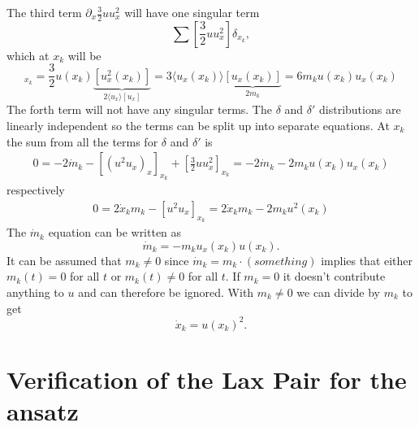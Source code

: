 \documentclass[english,master]{liumaiex}
\theoremstyle{plain}
\theoremstyle{definition}
\begin{document}
The third term $\partial_x \frac{3}{2}u u_x^2$ will have one singular term
\begin{equation}
	\sum [\frac{3}{2} u u_x^2] \delta_{x_k},
\end{equation}
which at $x_k$ will be
\begin{equation}
	[\frac{3}{2}u u_x^2]_{x_k} = \frac{3}{2}u(x_k) \underbrace{[u_x^2(x_k)]}_{2\langle u_x \rangle [u_x]} = 3 \langle u_x(x_k) \rangle \underbrace{[u_x(x_k)]}_{2m_k} = 6m_k u(x_k) u_x(x_k)
\end{equation}
%
The forth term will not have any singular terms. The $\delta$ and $\delta'$ distributions are linearly independent so the terms can be split up into separate equations. At $x_k$ the sum from all the terms for $\delta$ and $\delta'$ is
\begin{equation}
\begin{aligned}
	0 = -2 \dot{m}_k - [(u^2u_x)_x]_{x_k} + [\frac{3}{2}uu_x^2]_{x_k} = -2 \dot{m}_k - 2 m_k u(x_k) u_x(x_k)
\end{aligned}
\end{equation}
respectively
\begin{equation}
\begin{aligned}
	0 = 2 \dot{x}_k m_k - [u^2u_x]_{x_k} = 2 \dot{x}_k m_k - 2m_ku^2(x_k)
\end{aligned}
\end{equation}
%
The $\dot{m}_k$ equation can be written as
\begin{equation}
	\dot{m}_k = -m_ku_x(x_k)u(x_k).
\end{equation}
It can be assumed that $m_k \neq 0$ since $\dot{m}_k = m_k \cdot (something)$ implies that either $m_k(t) = 0$ for all $t$ or $m_k(t) \neq 0$ for all $t$. If $m_k = 0$ it doesn't contribute anything to $u$ and can therefore be ignored. With $m_k \neq 0$ we can divide by $m_k$ to get
\begin{equation}
	\dot{x}_k = u(x_k)^2.
\end{equation}

\section{Verification of the Lax Pair for the ansatz}


%
%
\newpage


\end{document}

